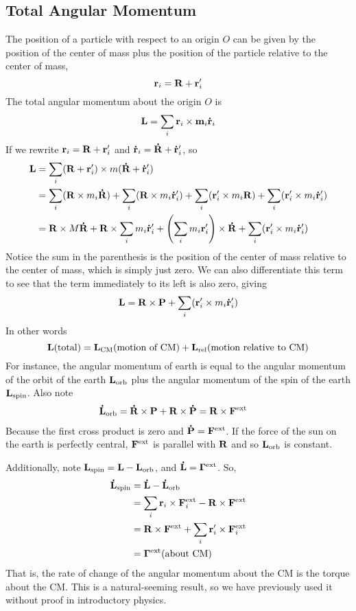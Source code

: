\subsection*{Total Angular Momentum}
The position of a particle with respect to an origin $O$ can be given by the position of the center of mass plus the position of the particle relative to the center of mass,
\[ \mathbf{r}_i = \mathbf{R} + \mathbf{r}'_i\]
The total angular momentum about the origin $O$ is 
\begin{align*}
    \mathbf{L} = \sum_i \mathbf{r}_i\times \mathbf{m}_i\mathbf{\dot r}_i
\end{align*}
If we rewrite $\mathbf{r}_i = \mathbf{R} + \mathbf{r}'_i$ and $\mathbf{\dot r}_i = \mathbf{\dot R} + \mathbf{\dot r}'_i$, so
\begin{align*}
    \mbf L &= \sum_i (\mbf R + \mbf r_i') \times m(\mbf{\dot R} + \mbf{\dot r}_i') \\
    &= \sum_i (\mbf R \times m_i\mbf{\dot R}) + \sum_i(\mbf R \times m_i\mbf{\dot r}_i') + \sum_i(\mbf r_i'\times m_i\mbf R) + \sum_i(\mbf r_i' \times m_i\mbf{\dot r}_i') \\
    &= \mbf R\times M\mbf{\dot R} + \mbf R \times \sum_i m_i\mbf{\dot r}_i' + \pqty{\sum_i m_i\mbf r_i'}\times \mbf{\dot R} + \sum_i(\mbf r_i' \times m_i\mbf{\dot r}_i') 
\end{align*}
Notice the sum in the parenthesis is the position of the center of mass relative to the center of mass, which is    simply just zero. We can also differentiate this term to see that the term immediately to its left is also zero, giving
\[ \mathbf{L} = \mathbf{R}\times \mathbf{P} +\sum_i(\mathbf{r}_i' \times m_i\mathbf{\dot r}_i')  \]
In other words
\[ \mathbf{L} \text{(total)} = \mathbf{L}_\text{CM}\text{(motion of CM)} + \mathbf{L}_\text{rel}\text{(motion relative to CM)}\]
For instance, the angular momentum of earth is equal to the angular momentum of the orbit of the earth $\mathbf{L}_\text{orb}$ plus the angular momentum of the spin of the earth $\mathbf{L}_\text{spin}$. Also note
\begin{align*}
    \mathbf{\dot L}_\text{orb} &= \mathbf{\dot R}\times \mathbf{P} + \mathbf{R} \times \mathbf{\dot P} = \mathbf{R} \times \mathbf{F}^\text{ext}
\end{align*}
Because the first cross product is zero and $\mathbf{\dot P} = \mathbf{F}^\text{ext}$. If the force of the sun on the earth is perfectly central, $\mathbf{F}^\text{ext}$ is parallel with $\mathbf{R}$ and so $\mathbf{L}_\text{orb}$ is constant.

Additionally, note $\mathbf{L}_\text{spin} = \mathbf{L} - \mathbf{L}_\text{orb}$, and $\mathbf{\dot L} = \boldsymbol{\Gamma}^\text{ext}$. So,
\begin{align*}
    \mathbf{\dot L}_\text{spin} &= \mathbf{\dot L} - \mathbf{\dot L}_\text{orb} \\
    &= \sum_i \mathbf{r}_i \times \mathbf{F}^\text{ext}_i - \mathbf{R} \times \mathbf{F}^\text{ext} \\
    &= \mathbf{R} \times \mathbf{F}^\text{ext} + \sum_i \mathbf{r}_i' \times \mathbf{F}^\text{ext}_i \\
    &= \mathbf{\Gamma}^\text{ext}\text{(about CM)}
\end{align*}
That is, the rate of change of the angular momentum about the CM is the torque about the CM. This is a natural-seeming result, so we have previously used it without proof in introductory physics.
